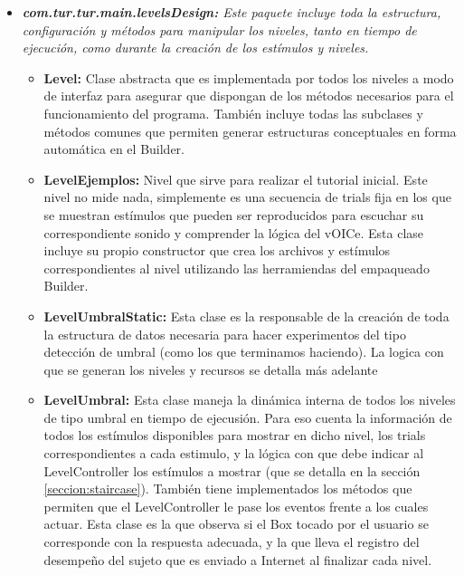 \documentclass{article}
\begin{document}
\begin{itemize}
        \item \textit{\textbf{com.tur.tur.main.levelsDesign:} Este paquete incluye toda la estructura, configuración y métodos para manipular los niveles, tanto en tiempo de ejecución, como durante la creación de los estímulos y niveles.}
        \begin{itemize}
            \item \textbf{Level:} Clase abstracta que es implementada por todos los niveles a modo de interfaz para asegurar que dispongan de los métodos necesarios para el funcionamiento del programa. También incluye todas las subclases y métodos comunes que permiten generar estructuras conceptuales en forma automática en el Builder. 
            \item \textbf{LevelEjemplos:} Nivel que sirve para realizar el tutorial inicial. Este nivel no mide nada, simplemente es una secuencia de trials fija en los que se muestran estímulos que pueden ser reproducidos para escuchar su correspondiente sonido y comprender la lógica del vOICe. Esta clase incluye su propio constructor que crea los archivos y estímulos correspondientes al nivel utilizando las herramiendas del empaqueado Builder. 
            \item \textbf{LevelUmbralStatic:} Esta clase es la responsable de la creación de toda la estructura de datos necesaria para hacer experimentos del tipo detección de umbral (como los que terminamos haciendo). La logica con que se generan los niveles y recursos se detalla más adelante
            \item \textbf{LevelUmbral:} Esta clase maneja la dinámica interna de todos los niveles de tipo umbral en tiempo de ejecusión. Para eso cuenta la información de todos los estímulos disponibles para mostrar en dicho nivel, los trials correspondientes a cada estimulo, y la lógica con que debe indicar al LevelController los estímulos a mostrar (que se detalla en la sección \ref{seccion:staircase}). También tiene implementados los métodos que permiten que el LevelController le pase los eventos frente a los cuales actuar. Esta clase es la que observa si el Box tocado por el usuario se corresponde con la respuesta adecuada, y la que lleva el registro del desempeño del sujeto que es enviado a Internet al finalizar cada nivel. 
        \end{itemize}
        

\end{itemize}
\end{document}
